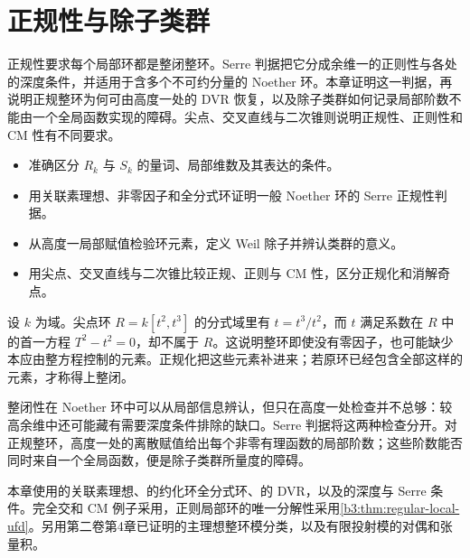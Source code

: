 
\chapter{正规性与除子类群}
\label{b3:ch:20}

\begin{chapterabstract}
	正规性要求每个局部环都是整闭整环。Serre 判据把它分成余维一的正则性与各处的深度条件，并适用于含多个不可约分量的 Noether 环。本章证明这一判据，再说明正规整环为何可由高度一处的 DVR 恢复，以及除子类群如何记录局部阶数不能由一个全局函数实现的障碍。尖点、交叉直线与二次锥则说明正规性、正则性和 CM 性有不同要求。
\end{chapterabstract}

\begin{learninggoals}
	\begin{itemize}
		\item 准确区分 \(R_k\) 与 \(S_k\) 的量词、局部维数及其表达的条件。
		\item 用关联素理想、非零因子和全分式环证明一般 Noether 环的 Serre 正规性判据。
		\item 从高度一局部赋值检验环元素，定义 Weil 除子并辨认类群的意义。
		\item 用尖点、交叉直线与二次锥比较正规、正则与 CM 性，区分正规化和消解奇点。
	\end{itemize}
\end{learninggoals}

设 \(k\) 为域。尖点环 \(R=k[t^2,t^3]\) 的分式域里有 \(t=t^3/t^2\)，而 \(t\) 满足系数在 \(R\) 中的首一方程 \(T^2-t^2=0\)，却不属于 \(R\)。这说明整环即使没有零因子，也可能缺少本应由整方程控制的元素。正规化把这些元素补进来；若原环已经包含全部这样的元素，才称得上整闭。

\ProseParagraphBreak

整闭性在 Noether 环中可以从局部信息辨认，但只在高度一处检查并不总够：较高余维中还可能藏有需要深度条件排除的缺口。Serre 判据将这两种检查分开。对正规整环，高度一处的离散赋值给出每个非零有理函数的局部阶数；这些阶数能否同时来自一个全局函数，便是除子类群所量度的障碍。

\ProseParagraphBreak

本章使用的关联素理想、的约化环全分式环、的 DVR，以及的深度与 Serre 条件。完全交和 CM 例子采用，正则局部环的唯一分解性采用\cref{b3:thm:regular-local-ufd}。另用第二卷第4章已证明的主理想整环模分类，以及有限投射模的对偶和张量积。

